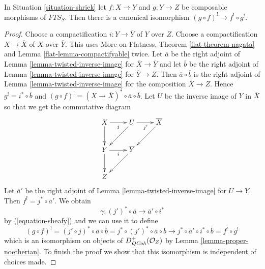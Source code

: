 \begin{lemma}
\label{lemma-upper-shriek-composition}
In Situation \ref{situation-shriek} let $f : X \to Y$ and $g : Y \to Z$
be composable morphisms of $\textit{FTS}_S$. Then there is a canonical
isomorphism $(g \circ f)^! \to f^! \circ g^!$.
\end{lemma}

\begin{proof}
Choose a compactification $i : Y \to \overline{Y}$ of $Y$ over $Z$.
Choose a compactification $X \to \overline{X}$ of $X$ over
$\overline{Y}$. This uses More on Flatness, Theorem \ref{flat-theorem-nagata}
and Lemma \ref{flat-lemma-compactifyable} twice.
Let $\overline{a}$ be the
right adjoint of Lemma \ref{lemma-twisted-inverse-image} for
$\overline{X} \to \overline{Y}$ and let $\overline{b}$
be the
right adjoint of Lemma \ref{lemma-twisted-inverse-image} for
$\overline{Y} \to Z$.
Then $\overline{a} \circ \overline{b}$ is the
right adjoint of Lemma \ref{lemma-twisted-inverse-image} for
the composition $\overline{X} \to Z$.
Hence $g^! = i^* \circ \overline{b}$ and
$(g \circ f)^! = (X \to \overline{X})^* \circ \overline{a} \circ \overline{b}$.
Let $U$ be the inverse image of $Y$ in $\overline{X}$
so that we get the commutative diagram
$$
\xymatrix{
X \ar[r]_j \ar[d] & U \ar[dl] \ar[r]_{j'} & \overline{X} \ar[dl] \\
Y \ar[r]_i \ar[d] & \overline{Y} \ar[dl] \\
Z
}
$$
Let $\overline{a}'$ be the
right adjoint of Lemma \ref{lemma-twisted-inverse-image} for
$U \to Y$.
Then $f^! = j^* \circ \overline{a}'$. We obtain
$$
\gamma : (j')^* \circ \overline{a} \to \overline{a}' \circ i^*
$$
by (\ref{equation-sheafy}) and we can use it to define
$$
(g \circ f)^! =
(j' \circ j)^* \circ \overline{a} \circ \overline{b} =
j^* \circ (j')^* \circ \overline{a} \circ \overline{b}
\to
j^* \circ \overline{a}' \circ i^* \circ \overline{b} =
f^! \circ g^!
$$
which is an isomorphism on objects of $D_{\mathit{QCoh}}^+(\mathcal{O}_Z)$ by
Lemma \ref{lemma-proper-noetherian}. To finish the proof we show that
this isomorphism is independent of choices made.


\end{proof}
